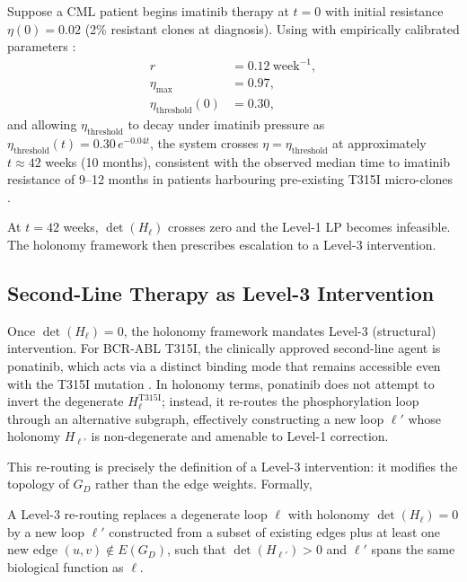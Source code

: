 \begin{example}
\label{ex:ch10-cml-resistance}
Suppose a CML patient begins imatinib therapy at $t = 0$ with initial resistance
$\eta(0) = 0.02$ (2\% resistant clones at diagnosis).  Using
 with empirically calibrated parameters
\citep{Michor2005}:
\begin{align*}
  r &= 0.12\ \mathrm{week}^{-1}, \\
  \eta_{\max} &= 0.97, \\
  \eta_{\mathrm{threshold}}(0) &= 0.30,
\end{align*}
and allowing $\eta_{\mathrm{threshold}}$ to decay under imatinib pressure as
$\eta_{\mathrm{threshold}}(t) = 0.30\, e^{-0.04 t}$, the system crosses
$\eta = \eta_{\mathrm{threshold}}$ at approximately $t \approx 42$ weeks (10
months), consistent with the observed median time to imatinib resistance of
9--12 months in patients harbouring pre-existing T315I micro-clones
\citep{Branford2003}.

At $t = 42$ weeks, $\det(H_\ell)$ crosses zero and the Level-1 LP becomes
infeasible.  The holonomy framework then prescribes escalation to a Level-3
intervention.
\end{example}

\subsection{Second-Line Therapy as Level-3 Intervention}

Once $\det(H_\ell) = 0$, the holonomy framework mandates Level-3 (structural)
intervention.  For BCR-ABL T315I, the clinically approved second-line agent is
ponatinib, which acts via a distinct binding mode that remains accessible even
with the T315I mutation \citep{OHare2009}.  In holonomy terms, ponatinib does
not attempt to invert the degenerate $H_\ell^{\mathrm{T315I}}$; instead, it
re-routes the phosphorylation loop through an alternative subgraph, effectively
constructing a new loop $\ell'$ whose holonomy $H_{\ell'}$ is non-degenerate
and amenable to Level-1 correction.

This re-routing is precisely the definition of a Level-3 intervention: it
modifies the topology of $G_D$ rather than the edge weights.  Formally,

\begin{definition}
\label{def:ch10-level3-reroute}
A Level-3 re-routing replaces a degenerate loop $\ell$ with holonomy
$\det(H_\ell) = 0$ by a new loop $\ell'$ constructed from a subset of existing
edges plus at least one new edge $(u, v) \notin E(G_D)$, such that
$\det(H_{\ell'}) > 0$ and $\ell'$ spans the same biological function as $\ell$.
\end{definition}

